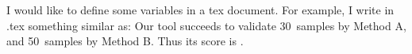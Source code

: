 \documentclass{article}
\newcommand\x{30}
\newcommand\y{50}
\begin{document}
 I would like to define some variables in a tex document. For example,
 I write in .tex something similar as: Our tool succeeds to validate \x\
 samples by Method A, and \y\ samples by Method B. Thus its score is
 \fpeval{\x+\y}.
\end{document}
